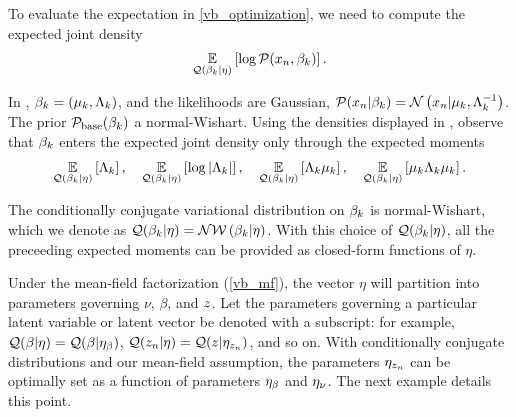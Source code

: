 \begin{ex}
%
To evaluate the expectation in \eqref{vb_optimization}, we need to compute
the expected joint density
\begin{align*}
  \expect{\q(\beta_\k \vert \eta)}{\log \p(\x_\n, \beta_\k)}. %
\end{align*}

In , $\beta_k = (\mu_k, \Lambda_k)$,
and the likelihoods are Gaussian,
$\mathcal{P}(x_n \vert \beta_k) = \mathcal{N}\left(x_n \vert \mu_k, \Lambda_k^{-1}\right)$.
The prior $\mathcal{P}_{\mathrm{base}}(\beta_k)$ a normal-Wishart.
Using the densities displayed in ,
observe that $\beta_k$ enters the expected joint density only through the
expected moments
%
\begin{align*}
\underset{\mathcal{Q}(\beta_k \vert \eta)}{\mathbb{E}}\left[\Lambda_k\right],  \quad
\underset{\mathcal{Q}(\beta_k \vert \eta)}{\mathbb{E}}\left[\log|\Lambda_k|\right],  \quad
\underset{\mathcal{Q}(\beta_k \vert \eta)}{\mathbb{E}}\left[\Lambda_k\mu_k\right], \quad
\underset{\mathcal{Q}(\beta_k \vert \eta)}{\mathbb{E}}\left[\mu_k\Lambda_k\mu_k\right].
\end{align*}

The conditionally conjugate variational distribution on $\beta_k$ is
normal-Wishart, which we denote as
$\mathcal{Q}(\beta_k \vert \eta) = \mathcal{N}\mathcal{W}\left(\beta_k \vert \eta\right)$.
With this choice of $\mathcal{Q}(\beta_k \vert \eta)$,
all the preceeding expected moments
can be provided as closed-form functions of $\eta$.
%
%
\end{ex}


Under the mean-field factorization (\eqref{vb_mf}),
the vector $\eta$ will partition into parameters
governing $\nu$, $\beta$, and $z$. Let the parameters governing a
particular latent variable or latent vector be denoted with a subscript: for example,
$\mathcal{Q}(\beta \vert \eta) = \mathcal{Q}(\beta \vert \eta_{\beta})$,
$\mathcal{Q}(z_n \vert \eta) = \mathcal{Q}(z \vert \eta_{z_{n}})$, and so on.
With conditionally conjugate distributions and our mean-field assumption,
the parameters $\eta_{z_{n}}$ can be optimally set as a function of
parameters $\eta_{\beta}$ and $\eta_{\nu}$.
The next example details this point.

